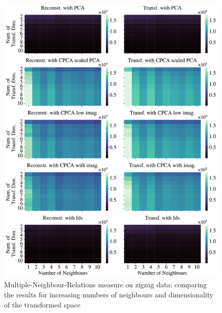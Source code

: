 \documentclass[pdftex,12pt,a4paper]{report}
\begin{document}
\begin{figure}
    \includegraphics[width = \textwidth]{images/multiple_runs/cpca/zigzag/num_neigh_vs_dyn_low/multiple_scalar_product_10runs_5lines_100points_10neighbours.pdf}
    \caption{Multiple-Neighbour-Relations measure on zigzag data: comparing the results for increasing numbers of neighbours and dimensionality of the transformed space}\label{fig:cpca-num_neigh_vs_dyn_low-zigzag-mscal}
\end{figure}
\end{document}
